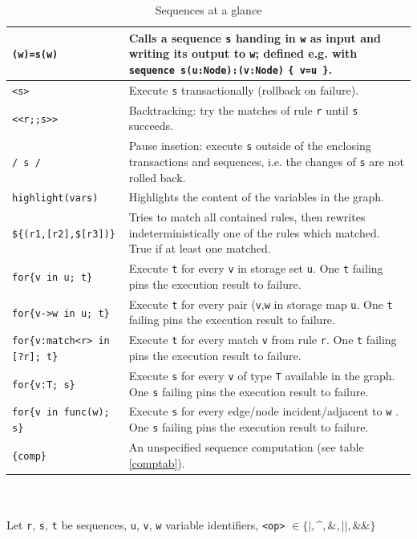 \begin{table}[htbp]
\begin{minipage}{\linewidth} \renewcommand{\footnoterule}{} 
\begin{tabularx}{\linewidth}{|lX|}
\hline
\texttt{(w)=s(w)} & Calls a sequence \texttt{s} handing in \texttt{w} as input and writing its output to \texttt{w}; defined e.g. with \texttt{sequence s(u:Node):(v:Node)} \texttt{\{ v=u \}}.\\
\hline
\texttt{<s>}	& Execute \texttt{s} transactionally (rollback on failure).\\
\texttt{<<r;;s>>}	& Backtracking: try the matches of rule \texttt{r} until \texttt{s} succeeds.\\
\texttt{/ s /}	& Pause insetion: execute \texttt{s} outside of the enclosing transactions and sequences, i.e. the changes of \texttt{s} are not rolled back.\\
\hline
\texttt{highlight(vars)} & Highlights the content of the variables in the graph. \\
\hline
\texttt{\$\{(r1,[r2],\$[r3])\}}	& Tries to match all contained rules, then rewrites indeterministically one of the rules which matched. True if at least one matched.\\
\hline
\texttt{for\{v in u; t\}}	& Execute \texttt{t} for every \texttt{v} in storage set \texttt{u}. One \texttt{t} failing pins the execution result to failure.\\
\texttt{for\{v->w in u; t\}}	& Execute \texttt{t} for every pair (\texttt{v},\texttt{w} in storage map \texttt{u}. One \texttt{t} failing pins the execution result to failure.\\
\texttt{for\{v:match<r> in [?r]; t\}}	& Execute \texttt{t} for every match \texttt{v} from rule \texttt{r}. One \texttt{t} failing pins the execution result to failure.\\
\texttt{for\{v:T; s\}}	& Execute \texttt{s} for every \texttt{v} of type \texttt{T} available in the graph. One \texttt{s} failing pins the execution result to failure.\\
\texttt{for\{v in func(w); s\}}	& Execute \texttt{s} for every edge/node incident/adjacent to \texttt{w} . One \texttt{s} failing pins the execution result to failure.\\
\hline
\texttt{\{comp\}}	& An unspecified sequence computation (see table \ref{comptab}).\\
\hline
\end{tabularx}\indexmain{\texttt{<>}}\indexmain{\texttt{<<;>>}}
\end{minipage}\\
\\ 
{\small Let \texttt{r}, \texttt{s}, \texttt{t} be sequences, \texttt{u}, \texttt{v}, \texttt{w} variable identifiers, \texttt{<op>} $\in \{\texttt{|}, \texttt{\textasciicircum}, \texttt{\&}, \texttt{||}, \texttt{\&\&}\}$ }%
\caption{Sequences at a glance}
\label{seqtab}
\end{table}
 
